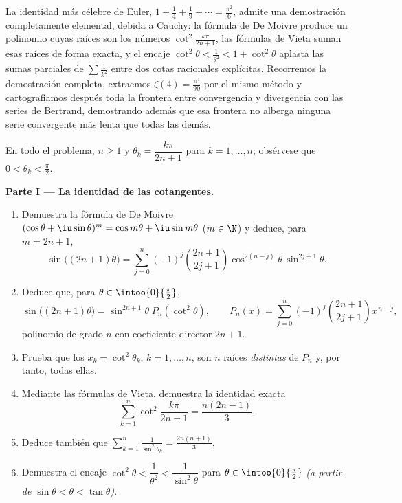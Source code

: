 La identidad más célebre de Euler, $1 + \frac14 + \frac19 + \cdots =
\frac{\pi^2}6$, admite una demostración completamente elemental,
debida a Cauchy: la fórmula de De Moivre produce un polinomio cuyas
raíces son los números $\cot^2\frac{k\pi}{2n+1}$, las fórmulas de
Vieta suman esas raíces de forma exacta, y el encaje $\cot^2\theta <
\frac{1}{\theta^2} < 1 + \cot^2\theta$ aplasta las sumas parciales de
$\sum\frac1{k^2}$ entre dos cotas racionales explícitas. Recorremos la
demostración completa, extraemos $\zeta(4) = \frac{\pi^4}{90}$ por el
mismo método y cartografiamos después toda la frontera entre
convergencia y divergencia con las series de Bertrand, demostrando
además que esa frontera no alberga ninguna serie convergente más
lenta que todas las demás.

\begin{problem}[{Problema de fin de semana --- $\zeta(2) = \pi^2/6$ y
el panorama de Bertrand}]
\label{pb:b2:series:1}
En todo el problema, $n \geq 1$ y $\theta_k = \dfrac{k\pi}{2n+1}$
para $k = 1, \dots, n$; obsérvese que $0 < \theta_k < \frac\pi2$.

\medskip
\noindent\textbf{Parte I --- La identidad de las cotangentes.}
\begin{enumerate}
  \item Demuestra la fórmula de De Moivre $(\cos\theta +
        \iu\sin\theta)^m = \cos m\theta + \iu\sin m\theta$ ($m \in
        \N$) y deduce, para $m = 2n + 1$,
        \[
        \sin\bigl((2n{+}1)\theta\bigr) = \sum_{j=0}^{n}
        (-1)^j\binom{2n+1}{2j+1}\cos^{2(n-j)}\theta\,
        \sin^{2j+1}\theta .
        \]
  \item Deduce que, para $\theta \in \intoo{0}{\frac\pi2}$,
        \[
        \sin\bigl((2n{+}1)\theta\bigr) =
        \sin^{2n+1}\theta\; P_n(\cot^2\theta),
        \qquad
        P_n(x) = \sum_{j=0}^{n}
        (-1)^j\binom{2n+1}{2j+1}x^{\,n-j},
        \]
        polinomio de grado $n$ con coeficiente director $2n + 1$.
  \item Prueba que los $x_k = \cot^2\theta_k$, $k = 1, \dots, n$,
        son $n$ raíces \emph{distintas} de $P_n$ y, por tanto, todas
        ellas.
  \item Mediante las fórmulas de Vieta, demuestra la identidad
        exacta
        \[
        \sum_{k=1}^{n} \cot^2\frac{k\pi}{2n+1}
        = \frac{n(2n-1)}{3}.
        \]
  \item Deduce también que $\displaystyle\sum_{k=1}^{n}
        \frac{1}{\sin^2\theta_k} = \frac{2n(n+1)}{3}$.
  \item Demuestra el encaje $\cot^2\theta < \dfrac1{\theta^2} <
        \dfrac{1}{\sin^2\theta}$ para $\theta \in
        \intoo{0}{\frac\pi2}$ \emph{(a partir de $\sin\theta <
        \theta < \tan\theta$)}.
\end{enumerate}


\end{problem}
